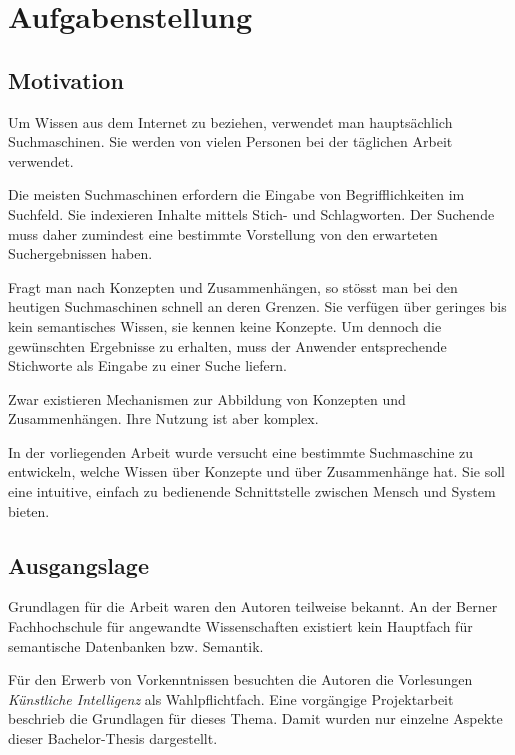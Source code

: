 \chapter{Aufgabenstellung}
\label{chap:Aufgabenstellung}


\section{Motivation}
\label{sec:aufgabe_motivation}
Um Wissen aus dem Internet zu beziehen, verwendet man hauptsächlich Suchmaschinen. Sie werden von vielen Personen bei der täglichen Arbeit verwendet.

Die meisten Suchmaschinen erfordern die Eingabe von Begrifflichkeiten im Suchfeld. Sie indexieren Inhalte mittels Stich- und Schlagworten. Der Suchende muss daher zumindest eine bestimmte Vorstellung von den erwarteten Suchergebnissen haben.

Fragt man nach Konzepten und Zusammenhängen, so stösst man bei den heutigen Suchmaschinen schnell an deren Grenzen. Sie verfügen über geringes bis kein semantisches Wissen, sie kennen keine Konzepte. Um dennoch die gewünschten Ergebnisse zu erhalten, muss der Anwender entsprechende Stichworte als Eingabe zu einer Suche liefern.

Zwar existieren Mechanismen zur Abbildung von Konzepten und Zusammenhängen. Ihre Nutzung ist aber komplex.

In der vorliegenden Arbeit wurde versucht eine bestimmte Suchmaschine zu entwickeln, welche Wissen über Konzepte und über Zusammenhänge hat. Sie soll eine intuitive, einfach zu bedienende Schnittstelle zwischen Mensch und System bieten.

\section{Ausgangslage}
\label{sec:aufgabe_ausgangslage}
Grundlagen für die Arbeit waren den Autoren teilweise bekannt. An der Berner Fachhochschule für angewandte Wissenschaften existiert kein Hauptfach für semantische Datenbanken bzw. Semantik.

Für den Erwerb von Vorkenntnissen besuchten die Autoren die Vorlesungen \textit{Künstliche Intelligenz} als Wahlpflichtfach. Eine vorgängige Projektarbeit beschrieb die Grundlagen für dieses Thema. Damit wurden nur einzelne Aspekte dieser Bachelor-Thesis dargestellt.

